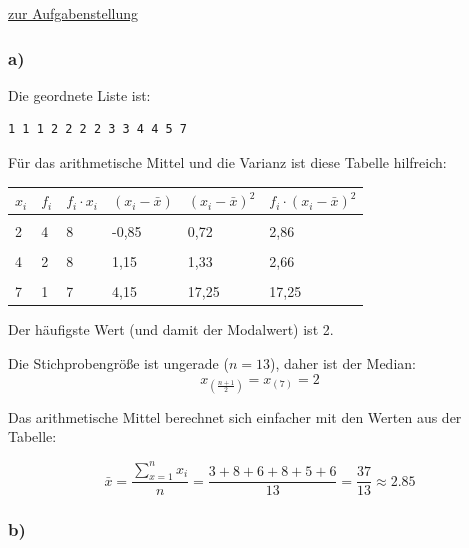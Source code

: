 \documentclass[
  11pt,
  ngerman,
  a4paper,
]{report}
\begin{document}
\protect\hyperlink{aufgabe-2-3}{zur Aufgabenstellung}

\hypertarget{a-4}{%
\subsubsection{a)}\label{a-4}}

Die geordnete Liste ist:

\begin{verbatim}
1 1 1 2 2 2 2 3 3 4 4 5 7
\end{verbatim}

Für das arithmetische Mittel und die Varianz ist diese Tabelle hilfreich:

\begin{table}[H]
\centering
\begin{tabular}{llllll}
\toprule
\textbf{$x_i$} & \textbf{$f_i$} & \textbf{$f_i\cdot x_i$} & \textbf{$(x_i-\bar{x})$} & \textbf{$(x_i-\bar{x})^2$} & \textbf{$f_i\cdot(x_i-\bar{x})^2$}\\
\midrule
\cellcolor{gray!6}{1} & \cellcolor{gray!6}{3} & \cellcolor{gray!6}{3} & \cellcolor{gray!6}{-1,85} & \cellcolor{gray!6}{3,41} & \cellcolor{gray!6}{10,22}\\
2 & 4 & 8 & -0,85 & 0,72 & 2,86\\
\cellcolor{gray!6}{3} & \cellcolor{gray!6}{2} & \cellcolor{gray!6}{6} & \cellcolor{gray!6}{0,15} & \cellcolor{gray!6}{0,02} & \cellcolor{gray!6}{0,05}\\
4 & 2 & 8 & 1,15 & 1,33 & 2,66\\
\cellcolor{gray!6}{5} & \cellcolor{gray!6}{1} & \cellcolor{gray!6}{5} & \cellcolor{gray!6}{2,15} & \cellcolor{gray!6}{4,64} & \cellcolor{gray!6}{4,64}\\
7 & 1 & 7 & 4,15 & 17,25 & 17,25\\
\bottomrule
\end{tabular}
\end{table}

Der häufigste Wert (und damit der Modalwert) ist 2.

Die Stichprobengröße ist ungerade (\(n=13\)), daher ist der Median: \[x_{(\frac{n+1}{2})} = x_{(7)} = 2\]

Das arithmetische Mittel berechnet sich einfacher mit den Werten aus der Tabelle:

\[\bar{x}={\displaystyle\frac{\sum\limits_{x=1}^nx_i}{n}}=\frac{3+8+6+8+5+6}{13}=\frac{37}{13}\approx2.85\]

\hypertarget{b-4}{%
\subsubsection{b)}\label{b-4}}
\end{document}
